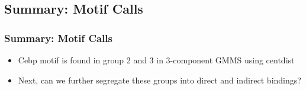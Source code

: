 \documentclass[notes]{beamer}
\begin{document}
\subsection{Summary: Motif Calls}
\begin{frame}
    \frametitle{Summary: Motif Calls}
    \begin{itemize}[<+->]
        \item Cebp motif is found in group 2 and 3 in 3-component GMMS using centdist
        \item Next, can we further segregate these groups into direct and indirect bindings?
    \end{itemize}
\end{frame} 

\end{document}
